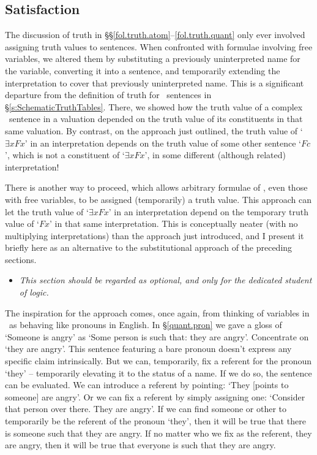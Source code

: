 \begin{earg}
\section{Satisfaction} \label{s:Sats} %

The discussion of truth in §§\ref{fol.truth.atom}–\ref{fol.truth.quant} only ever involved assigning truth values to sentences. When confronted with formulae involving free variables, we altered them by substituting a previously uninterpreted name for the variable, converting it into a sentence, and temporarily extending the interpretation to cover that previously uninterpreted name. This is a significant departure from the definition of truth for \TFL\ sentences in §\ref{s:SchematicTruthTables}. There, we showed how the truth value of a complex \TFL\ sentence in a valuation depended on the truth value of its constituents in that same valuation. By contrast, on the approach just outlined, the truth value of `$\exists x Fx$' in an interpretation depends on the truth value of some other sentence `$Fc$', which is not a constituent of `$\exists x Fx$', in some different (although related) interpretation! 

There is another way to proceed, which allows arbitrary formulae of \FOL, even those with free variables, to be assigned (temporarily) a truth value. This approach can let the truth value of `$\exists x Fx$' in an interpretation depend on the temporary truth value of `$Fx$' in that same interpretation. This is conceptually neater (with no multiplying interpretations) than the approach just introduced, and I present it briefly here as an alternative to the substitutional approach of the preceding sections.

\begin{itemize}
 	\item \emph{This section should be regarded as optional, and only for the dedicated student of logic.}
 \end{itemize} 

The inspiration for the approach comes, once again, from thinking of variables in \FOL\ as behaving like pronouns in English. In §\ref{quant.pron} we gave a gloss of `Someone is angry' as `Some person is such that: they are angry'. Concentrate on `they are angry'. This sentence featuring a bare pronoun doesn't express any specific claim intrinsically. But we can, temporarily, fix a referent for the pronoun `they' – temporarily elevating it to the status of a name. If we do so, the sentence can be evaluated. We can introduce a referent by pointing: `They [points to someone] are angry'. Or we can fix a referent by simply assigning one: `Consider that person over there. They are angry'. If we can find someone or other to temporarily be the referent of the pronoun `they', then it will be true that there is someone such that they are angry. If no matter who we fix as the referent, they are angry, then it will be true that everyone is such that they are angry. 


\end{earg}
